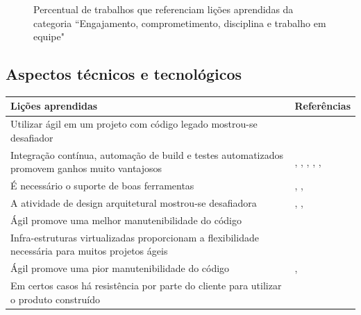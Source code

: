 \begin{figure}[H]
	\centering
	\captionsetup{justification=centering}
	\caption{Percentual de trabalhos que referenciam lições aprendidas da categoria ``Engajamento, comprometimento, disciplina e trabalho em equipe"}
	\label{fig:comprometimento}
\end{figure}

\subsection{Aspectos técnicos e tecnológicos}

\begin{table}[H]
	\centering
	\begin{tabularx}{\linewidth}{ | X | p{5cm} | } \hline \textbf{Lições aprendidas} & \textbf{Referências} \\ \hline
		Utilizar ágil em um projeto com código legado mostrou-se desafiador & \cite{Block2011} \\ \hline
		Integração contínua, automação de build e testes automatizados promovem ganhos muito vantajosos & \cite{Block2011}, \cite{Microsoft2013}, \cite{Korhonen2010}, \cite{Cisco2011}, \cite{Lapham2012}, \cite{Eunha2012} \\ \hline
		É necessário o suporte de boas ferramentas & \cite{Fitzgerald2013}, \cite{Microsoft2013}, \cite{Arikpo2011} \\ \hline
		A atividade de design arquitetural mostrou-se desafiadora & \cite{Bustard2013}, \cite{Radha2012}, \cite{Piegas2012} \\ \hline
		Ágil promove uma melhor manutenibilidade do código & \cite{Bustard2013} \\ \hline
		Infra-estruturas virtualizadas proporcionam a flexibilidade necessária para muitos projetos ágeis & \cite{Radha2012} \\ \hline
		Ágil promove uma pior manutenibilidade do código & \cite{Nokia2013}, \cite{Queiroz2013} \\ \hline
		Em certos casos há resistência por parte do cliente para utilizar o produto construído & \cite{Stefano2013} \\ \hline
	\end{tabularx}
\end{table}

